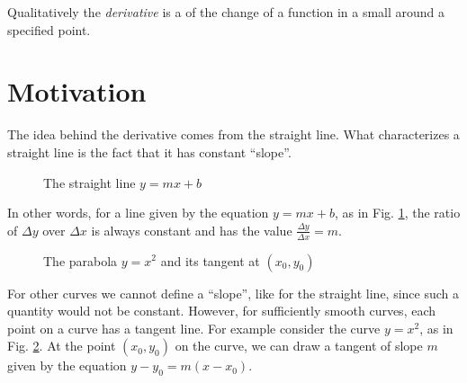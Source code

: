 \documentclass[12pt]{article}
\begin{document}

	Qualitatively the {\em derivative} is a  of the change of a
	function in a small  around a specified point.

\section*{Motivation}
	The idea behind the derivative comes from the straight line. What
	characterizes a straight line is the fact that it has constant
	``slope''. 
	\begin{figure}[h]
	\begin{center}
		
		\caption{The straight line $y=mx+b$\label{line}}
	\end{center}
	\end{figure}
	In other words, for a line given by the equation $y=mx+b$, as in Fig.
	\ref{line}, the ratio of $\Delta y$ over $\Delta x$ is always constant
	and has the value $\displaystyle \frac{\Delta y}{\Delta x} = m$.

	\begin{figure}[h]
	\begin{center}
		
		\caption{The parabola $y=x^2$ and its tangent at $(x_0,y_0)$
			\label{parabola}}
	\end{center}
	\end{figure}
	For other curves we cannot define a ``slope'', like for the straight
	line, since such a quantity would not be constant. However, for
	sufficiently smooth curves, each point on a curve has a tangent line.
	For example consider the curve $y=x^2$, as in Fig. \ref{parabola}. At
	the point $(x_0,y_0)$ on the curve, we can draw a tangent of slope $m$
	given by the equation $y-y_0=m(x-x_0)$.
\end{document}
